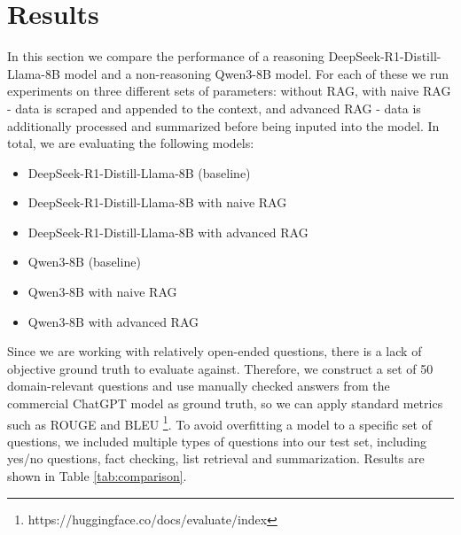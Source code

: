 \documentclass[fleqn,moreauthors,10pt]{ds_report}
\begin{document}


\section*{Results}

In this section we compare the performance of a reasoning DeepSeek-R1-Distill-Llama-8B \cite{deepseek3} model and a non-reasoning Qwen3-8B \cite{qwen3} model. For each of these we run experiments on three different sets of parameters: without RAG, with naive RAG - data is scraped and appended to the context, and advanced RAG - data is additionally processed and summarized before being inputed into the model. In total, we are evaluating the following models:
\begin{itemize}
	\item DeepSeek-R1-Distill-Llama-8B (baseline)
	\item DeepSeek-R1-Distill-Llama-8B with naive RAG
	\item DeepSeek-R1-Distill-Llama-8B with advanced RAG
	\item Qwen3-8B (baseline)
	\item Qwen3-8B with naive RAG
	\item Qwen3-8B with advanced RAG
\end{itemize}

Since we are working with relatively open-ended questions, there is a lack of objective ground truth to evaluate against. Therefore, we construct a set of 50 domain-relevant questions and use manually checked answers from the commercial ChatGPT model as ground truth, so we can apply standard metrics such as ROUGE and BLEU \footnote{https://huggingface.co/docs/evaluate/index}. To avoid overfitting a model to a specific set of questions, we included multiple types of questions into our test set, including yes/no questions, fact checking, list retrieval and summarization. Results are shown in Table \ref{tab:comparison}.

\begin{table}[!htb]
\centering
{}
\caption{Performance comparison against ChatGPT-generated ground truth.}
\label{tab:comparison}
\end{table}
\end{document}

